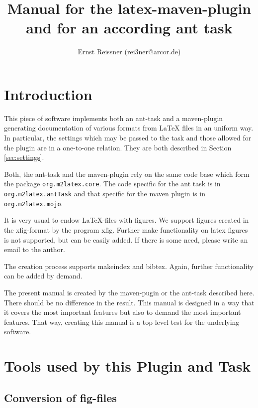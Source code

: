 \documentclass[12pt]{article}
\title{Manual for the latex-maven-plugin and for an according ant task }
\author{Ernst Reissner (rei3ner@arcor.de)}
\begin{document}
\maketitle

\tableofcontents
\listoffigures
\listoftables


\section{Introduction}

This piece of software implements both an ant-task and a maven-plugin 
generating documentation of various formats from LaTeX files 
in an uniform way. 
In particular, the settings which may be passed to the task 
and those allowed for the plugin are in a one-to-one relation. 
They are both described in Section \ref{sec:settings}. 

Both, the ant-task and the maven-plugin rely on the same code base 
which form the package {\tt org.m2latex.core}. 
The code specific for the ant task is in {\tt org.m2latex.antTask} 
and that specific for the maven plugin is in {\tt org.m2latex.mojo}. 

It is very usual to endow LaTeX-files with figures. 
We support figures created in the xfig-format 
by the program xfig. 
Further make functionality on latex figures is not supported, 
but can be easily added. 
If there is some need, please write an email to the author. 

The creation process supports makeindex and bibtex. 
Again, further functionality can be added by demand. 

The present manual is created by the maven-pugin or the ant-task 
described here. 
There should be no difference in the result. 
This manual is designed in a way that it covers the most important features 
but also to demand the most important features. 
That way, creating this manual is a top level test 
for the underlying software. 


\section{Tools used by this Plugin and Task}\label{sec:tools}


\subsection{Conversion of fig-files}\label{subsec:fig2dev}
\end{document}
